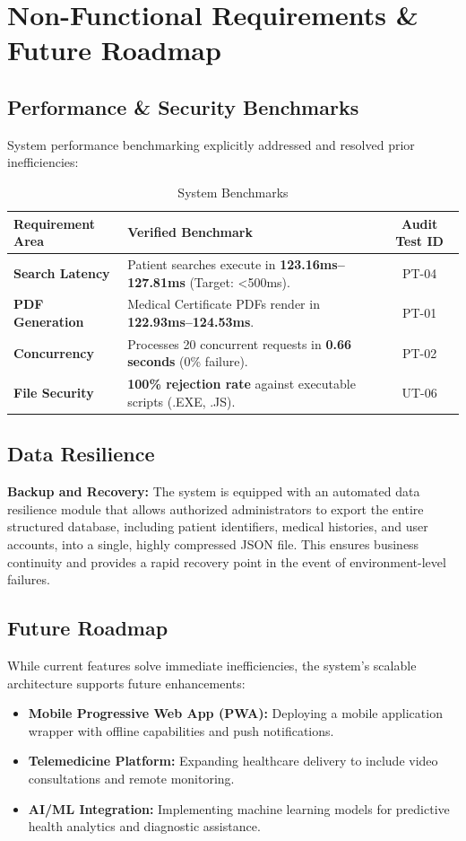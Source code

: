 \section{Non-Functional Requirements \& Future Roadmap}

\subsection{Performance \& Security Benchmarks}
System performance benchmarking explicitly addressed and resolved prior inefficiencies:

\begin{table}[htbp]
\centering
\caption{System Benchmarks}
\begin{tabularx}{\textwidth}{|Y|Y|c|}
\hline
\textbf{Requirement Area} & \textbf{Verified Benchmark} & \textbf{Audit Test ID} \\
\hline
\textbf{Search Latency} & Patient searches execute in \textbf{123.16ms--127.81ms} (Target: <500ms). & PT-04 \\
\hline
\textbf{PDF Generation} & Medical Certificate PDFs render in \textbf{122.93ms--124.53ms}. & PT-01 \\
\hline
\textbf{Concurrency} & Processes 20 concurrent requests in \textbf{0.66 seconds} (0\% failure). & PT-02 \\
\hline
\textbf{File Security} & \textbf{100\% rejection rate} against executable scripts (.EXE, .JS). & UT-06 \\
\hline
\end{tabularx}
\end{table}

\subsection{Data Resilience}
\textbf{Backup and Recovery:} The system is equipped with an automated data resilience module that allows authorized administrators to export the entire structured database, including patient identifiers, medical histories, and user accounts, into a single, highly compressed JSON file. This ensures business continuity and provides a rapid recovery point in the event of environment-level failures.

\subsection{Future Roadmap}
While current features solve immediate inefficiencies, the system's scalable architecture supports future enhancements:
\begin{itemize}
    \item \textbf{Mobile Progressive Web App (PWA):} Deploying a mobile application wrapper with offline capabilities and push notifications.
    \item \textbf{Telemedicine Platform:} Expanding healthcare delivery to include video consultations and remote monitoring.
    \item \textbf{AI/ML Integration:} Implementing machine learning models for predictive health analytics and diagnostic assistance.
\end{itemize}
